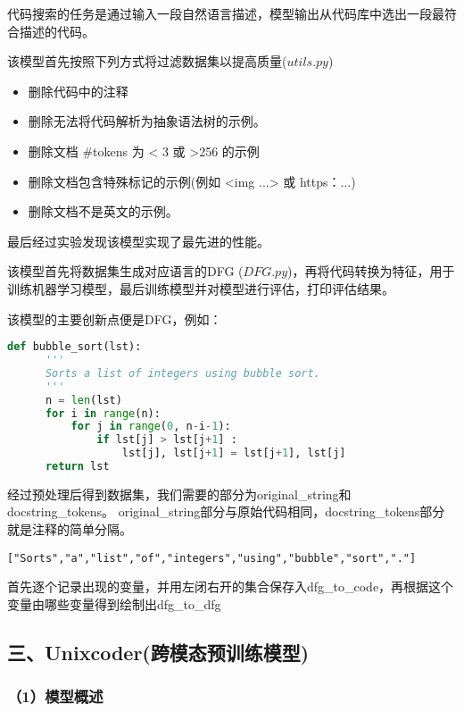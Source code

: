 \documentclass[12pt]{article}
\begin{document}
代码搜索的任务是通过输入一段自然语言描述，模型输出从代码库中选出一段最符合描述的代码。

该模型首先按照下列方式将过滤数据集以提高质量(\(utils.py\))

\begin{itemize}
      \item
            删除代码中的注释
      \item
            删除无法将代码解析为抽象语法树的示例。
      \item
            删除文档 \#tokens 为 \textless{} 3 或 \textgreater256 的示例
      \item
            删除文档包含特殊标记的示例(例如 \textless img ...\textgreater{} 或
            https：...)
      \item
            删除文档不是英文的示例。
\end{itemize}

最后经过实验发现该模型实现了最先进的性能。

该模型首先将数据集生成对应语言的DFG
(\(DFG.py\))，再将代码转换为特征，用于训练机器学习模型，最后训练模型并对模型进行评估，打印评估结果。

该模型的主要创新点便是DFG，例如：

\begin{lstlisting}[language=Python]
def bubble_sort(lst):
      '''
      Sorts a list of integers using bubble sort.
      '''
      n = len(lst)
      for i in range(n):
          for j in range(0, n-i-1):
              if lst[j] > lst[j+1] :
                  lst[j], lst[j+1] = lst[j+1], lst[j]
      return lst
\end{lstlisting}


经过预处理后得到数据集，我们需要的部分为original\_string和docstring\_tokens。
original\_string部分与原始代码相同，docstring\_tokens部分就是注释的简单分隔。
\begin{lstlisting}
["Sorts","a","list","of","integers","using","bubble","sort","."]
\end{lstlisting}

首先逐个记录出现的变量，并用左闭右开的集合保存入dfg\_to\_code，再根据这个变量由哪些变量得到绘制出dfg\_to\_dfg

\subsection*{三、Unixcoder(跨模态预训练模型)}

\subsubsection*{（1）模型概述}
\end{document}

